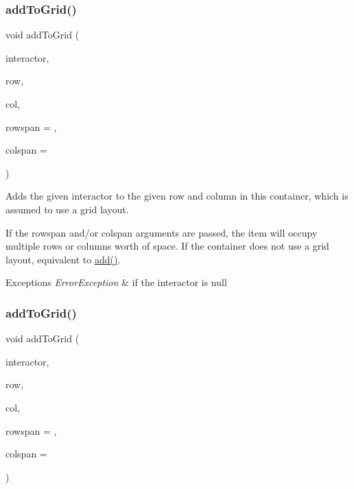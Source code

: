 \subsubsection{\texorpdfstring{add\+To\+Grid()}{addToGrid()}\hspace{0.1cm}{\footnotesize\ttfamily [1/2]}}
{\footnotesize\ttfamily void add\+To\+Grid (\begin{DoxyParamCaption}\item[{\mbox{\hyperlink{classGInteractor}{G\+Interactor}} $\ast$}]{interactor,  }\item[{int}]{row,  }\item[{int}]{col,  }\item[{int}]{rowspan = {},  }\item[{int}]{colspan = {} }\end{DoxyParamCaption})\hspace{0.3cm}{\ttfamily [virtual]}}



Adds the given interactor to the given row and column in this container, which is assumed to use a grid layout. 

If the rowspan and/or colspan arguments are passed, the item will occupy multiple rows or columns\textquotesingle{} worth of space. If the container does not use a grid layout, equivalent to \mbox{\hyperlink{classGContainer_a6f99b7c841256dbdc5acaafbbca4e685}{add()}}. 
\begin{DoxyExceptions}{Exceptions}
{\em Error\+Exception} & if the interactor is null \\
\hline
\end{DoxyExceptions}
\mbox{\label{classGContainer_abc297ebf9136261c21e2df3c771df0b3}} 
\subsubsection{\texorpdfstring{add\+To\+Grid()}{addToGrid()}\hspace{0.1cm}{\footnotesize\ttfamily [2/2]}}
{\footnotesize\ttfamily void add\+To\+Grid (\begin{DoxyParamCaption}\item[{\mbox{\hyperlink{classGInteractor}{G\+Interactor}} \&}]{interactor,  }\item[{int}]{row,  }\item[{int}]{col,  }\item[{int}]{rowspan = {},  }\item[{int}]{colspan = {} }\end{DoxyParamCaption})\hspace{0.3cm}{\ttfamily [virtual]}}



